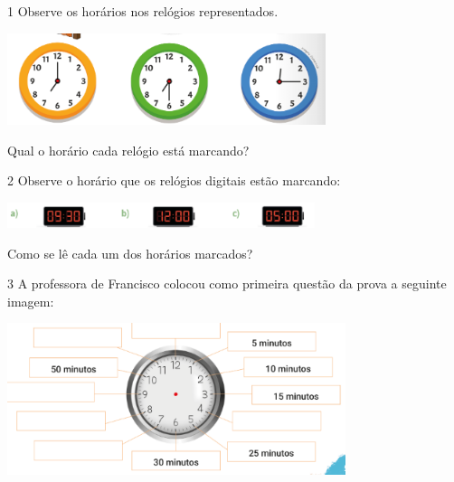
\num{1} Observe os horários nos relógios representados.


\includegraphics[width=3.66698in,height=1.05843in]{./media/image51.png}

Qual o horário cada relógio está marcando?




\num{2} Observe o horário que os relógios digitais estão marcando:


\includegraphics[width=3.54197in,height=0.29169in]{./media/image52.png}

Como se lê cada um dos horários marcados?




\num{3} A professora de Francisco colocou como primeira questão da prova a seguinte imagem:


\includegraphics[width=3.90034in,height=1.75015in]{./media/image53.png}

